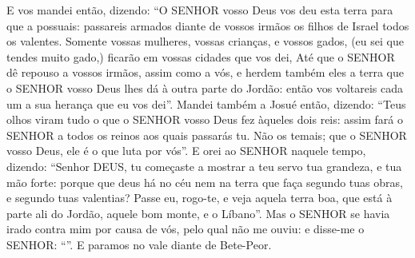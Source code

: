 {{  E vos mandei então, dizendo: \enquote{O SENHOR vosso Deus vos deu esta terra para que a possuais: passareis armados diante de vossos irmãos os filhos de Israel todos os valentes.
  Somente vossas mulheres, vossas crianças, e vossos gados, (eu sei que tendes muito gado,) ficarão em vossas cidades que vos dei,
  Até que o SENHOR dê repouso a vossos irmãos, assim como a vós, e herdem também eles a terra que o SENHOR vosso Deus lhes dá à outra parte do Jordão: então vos voltareis cada um a sua herança que eu vos dei}.
  Mandei também a Josué então, dizendo: \enquote{Teus olhos viram tudo o que o SENHOR vosso Deus fez àqueles dois reis: assim fará o SENHOR a todos os reinos aos quais passarás tu.
  Não os temais; que o SENHOR vosso Deus, ele é o que luta por vós}.
  E orei ao SENHOR naquele tempo, dizendo:
  \enquote{Senhor DEUS, tu começaste a mostrar a teu servo tua grandeza, e tua mão forte: porque que deus há no céu nem na terra que faça segundo tuas obras, e segundo tuas valentias?
  Passe eu, rogo-te, e veja aquela terra boa, que está à parte ali do Jordão, aquele bom monte, e o Líbano}.
  Mas o SENHOR se havia irado contra mim por causa de vós, pelo qual não me ouviu: e disse-me o SENHOR: \enquote{}.
  E paramos no vale diante de Bete-Peor}.
\par }

